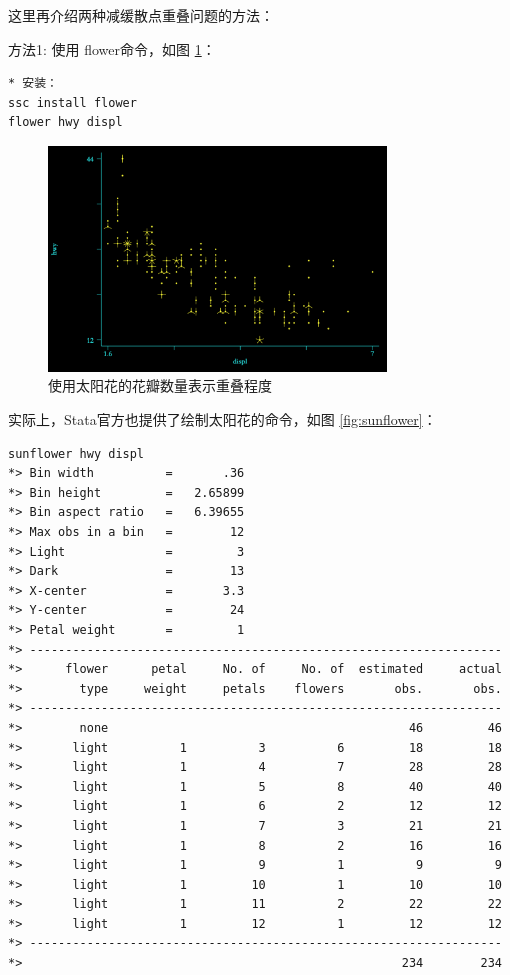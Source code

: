 \documentclass[]{ctexbook}
\begin{document}
这里再介绍两种减缓散点重叠问题的方法：

方法1: 使用 flower命令，如图 \ref{fig:flower}：

\begin{lstlisting}
* 安装：
ssc install flower
flower hwy displ
\end{lstlisting}

\begin{figure}

{\centering \includegraphics[width=0.8\textwidth]{assets/flower} 

}

\caption{使用太阳花的花瓣数量表示重叠程度}\label{fig:flower}
\end{figure}

实际上，Stata官方也提供了绘制太阳花的命令，如图 \ref{fig:sunflower}：

\begin{lstlisting}
sunflower hwy displ
*> Bin width          =       .36
*> Bin height         =   2.65899
*> Bin aspect ratio   =   6.39655
*> Max obs in a bin   =        12
*> Light              =         3
*> Dark               =        13
*> X-center           =       3.3
*> Y-center           =        24
*> Petal weight       =         1
*> ------------------------------------------------------------------
*>      flower      petal     No. of     No. of  estimated     actual
*>        type     weight     petals    flowers       obs.       obs.
*> ------------------------------------------------------------------
*>        none                                          46         46
*>       light          1          3          6         18         18
*>       light          1          4          7         28         28
*>       light          1          5          8         40         40
*>       light          1          6          2         12         12
*>       light          1          7          3         21         21
*>       light          1          8          2         16         16
*>       light          1          9          1          9          9
*>       light          1         10          1         10         10
*>       light          1         11          2         22         22
*>       light          1         12          1         12         12
*> ------------------------------------------------------------------
*>                                                     234        234
\end{lstlisting}
\end{document}
